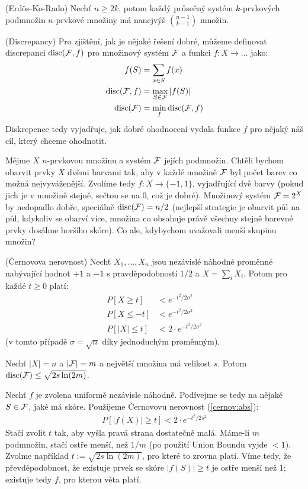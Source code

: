 \vt (Erdös-Ko-Rado) Nechť $n \geq 2k$, potom každý průsečný systém
$k$-prvkových podmnožin $n$-prvkové množiny má nanejvýš $\binom{n-1}{k-1}$
množin.

\df (Discrepancy) Pro zjištění, jak je nějaké řešení dobré, můžeme definovat
discrepanci $\operatorname{disc}(\mathcal{F},f)$ pro množinový systém $\mathcal{F}$ a funkci $f: X \to \dots$
jako:
\begin{align}
	f(S) &= \sum_{x\in S} f(x) \\
	\operatorname{disc}(\mathcal{F},f) &= \max_{S\in \mathcal{F}} |f(S)| \\
	\operatorname{disc}(\mathcal{F}) &= \min_f \operatorname{disc}(\mathcal{F},f)
\end{align}
Diskrepence tedy vyjadřuje, jak dobré ohodnocení vydala funkce $f$ pro nějaký
náš cíl, který chceme ohodnotit.

\app Mějme $X$ $n$-prvkovou množinu a systém $\mathcal{F}$ jejích podmnožin. Chtěli
bychom obarvit prvky $X$ dvěmi barvami tak, aby v každé množině $\mathcal{F}$ byl počet
barev co možná nejvyváženější. Zvolíme tedy $f: X \to \{-1, 1\}$, vyjadřující
dvě barvy (pokud jich je v množině stejně, sečtou se na 0, což je dobré).
Množinový systém $\mathcal{F} = 2^X$ by nedopadlo dobře, speciálně $\operatorname{disc}(\mathcal{F}) = n/2$
(nejlepší strategie je obarvit půl na půl, kdykoliv se obarví více, množina co
obsahuje právě všechny stejně barevné prvky dosáhne horšího skóre). Co ale,
kdybychom uvažovali menší skupinu množin?

\tv (Černovova nerovnost) Nechť $X_1, \dots, X_n$ jsou nezávislé náhodné
proměnné nabývající hodnot $+1$ a $-1$ s pravděpodobností $1/2$ a $X = \sum_i
X_i$. Potom pro každé $t \geq 0$ platí:
\begin{align}
	P[X \geq t] &< e^{-t^2/2\sigma^2} \\
	P[X \leq -t] &< e^{-t^2/2\sigma^2}\\
	\label{cernov:abs} P[|X| \leq t] &< 2\cdot e^{-t^2/2\sigma^2}
\end{align}
(v tomto případě $\sigma = \sqrt{n}$ díky jednoduchým proměnným).


\tv Nechť $|X|=n$ a $|\mathcal{F}| = m$ a největší množina má velikost $s$.  Potom
$\operatorname{disc}(\mathcal{F}) \leq \sqrt{2s\ln(2m)}$.

\dk Nechť $f$ je zvolena uniformě nezávisle náhodně. Podívejme se tedy na nějaké
$S \in \mathcal{F}$, jaké má skóre. Použijeme Černovovu nerovnost (\ref{cernov:abs}):
\begin{align}
	P[|f(X)| \geq t] < 2 \cdot e^{-t^2/2s^2}
\end{align}
Stačí zvolit $t$ tak, aby vyšla pravá strana dostatečně malá. Máme-li $m$
podmnožin, stačí ostře menší, než $1/m$ (po použití Union Boundu vyjde $< 1$).
Zvolme například $t := \sqrt{2s\ln(2m)}$, pro které to zrovna platí. Víme tedy,
že převděpodobnost, že existuje prvek se skóre $|f(S)| \geq t$ je ostře menší
než 1; existuje tedy $f$, pro kterou věta platí.

